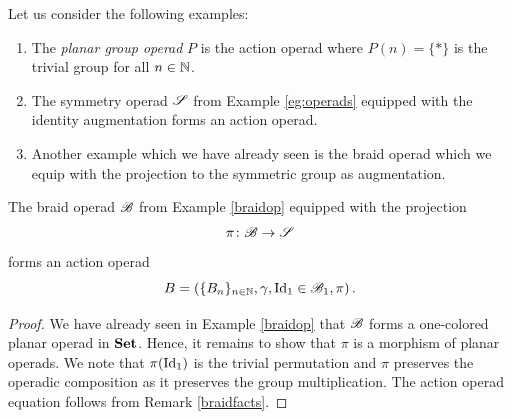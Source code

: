 \begin{eg}
    Let us consider the following examples:
    \begin{enumerate}
        \item The \textit{planar group operad} $P$ is the action operad where
        $P(n) = \{\ast\}$ is the trivial group for all $n \in \N$. 
        \item The symmetry operad $\S$ from Example \ref{eg:operads} equipped
        with the identity augmentation forms an action operad.
        \item Another example which we have already seen is the braid operad
        which we equip with the projection to the symmetric group as
        augmentation.
    \end{enumerate}
\end{eg}

\begin{prop}
    The braid operad $\B$ from Example \ref{braidop} equipped with the
    projection 
    \[
        \pi \colon \B \to \S
    \]
    forms an action operad
    \[
        B = \left( \{B_n\}_{n \in \N}, \gamma, \id_1 \in \B_1, \pi \right).
    \]
\end{prop}

\begin{proof}
    We have already seen in Example \ref{braidop} that $\B$ forms a one-colored planar operad in $\Set$.
    Hence, it remains to show that $\pi$ is a morphism of planar operads. We
    note that $\pi(\id_1)$ is the trivial permutation and $\pi$ preserves the
    operadic composition as it preserves the group multiplication. The action
    operad equation follows from Remark \ref{braidfacts}.
\end{proof}




